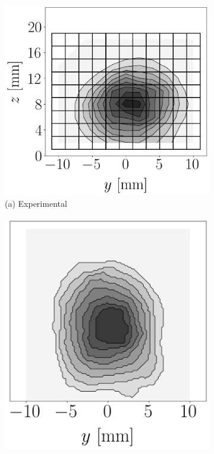 \begin{figure}[h!]
\flushleft
\begin{subfigure}[b]{0.2\textwidth}
	\flushleft
   \includegraphics[scale=0.225]{./part2_developments/figures_ch6_lagrangian_JICF/previous_numerical_results/map_expe}
   \caption*{\hspace{0.35in}(a) Experimental}
\end{subfigure}
\hspace*{0.35in}
\begin{subfigure}[b]{0.2\textwidth}
	\flushleft
   \includegraphics[scale=0.225]{./part2_developments/figures_ch6_lagrangian_JICF/previous_numerical_results/map_jaegle}

\end{subfigure}
\end{figure}
